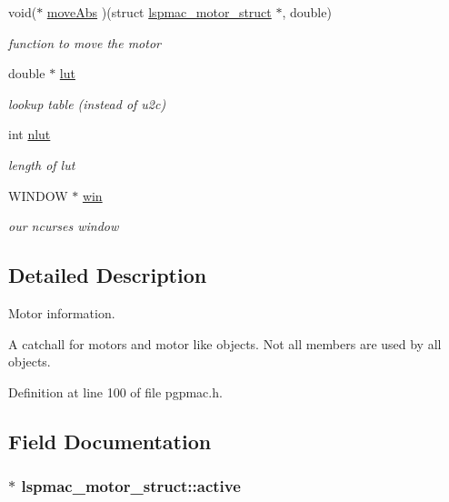 \begin{DoxyCompactItemize}
void($\ast$ \hyperlink{structlspmac__motor__struct_a20db3de86854b627815b3d940555ea75}{move\-Abs} )(struct \hyperlink{structlspmac__motor__struct}{lspmac\-\_\-motor\-\_\-struct} $\ast$, double)
\begin{DoxyCompactList}\small\item\em function to move the motor \end{DoxyCompactList}\item 
double $\ast$ \hyperlink{structlspmac__motor__struct_a7b43671f7f3e06521f6cf91fb9ac707d}{lut}
\begin{DoxyCompactList}\small\item\em lookup table (instead of u2c) \end{DoxyCompactList}\item 
int \hyperlink{structlspmac__motor__struct_a11cbc6f50c150ed446e9a901cf7cc12b}{nlut}
\begin{DoxyCompactList}\small\item\em length of lut \end{DoxyCompactList}\item 
W\-I\-N\-D\-O\-W $\ast$ \hyperlink{structlspmac__motor__struct_a133775154b0e008f3a2fde6f53bc0eff}{win}
\begin{DoxyCompactList}\small\item\em our ncurses window \end{DoxyCompactList}\end{DoxyCompactItemize}


\subsection{Detailed Description}
Motor information. 

A catchall for motors and motor like objects. Not all members are used by all objects. 

Definition at line 100 of file pgpmac.\-h.



\subsection{Field Documentation}
\hypertarget{structlspmac__motor__struct_aed4998885bcd5a2a30069637180f58e3}{
\subsubsection[{active}]{$\ast$ lspmac\-\_\-motor\-\_\-struct\-::active}}\label{structlspmac__motor__struct_aed4998885bcd5a2a30069637180f58e3}


